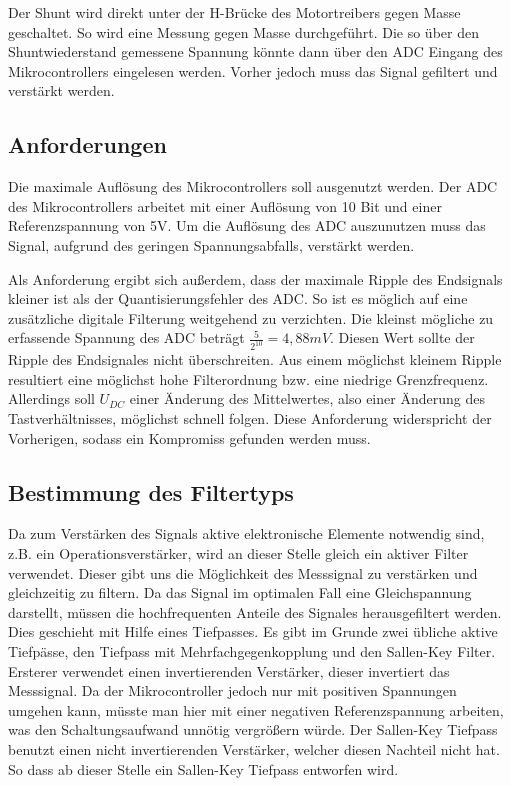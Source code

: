 Der Shunt wird direkt unter der H-Brücke des Motortreibers gegen Masse geschaltet. So wird eine Messung gegen Masse durchgeführt. Die so über den Shuntwiederstand gemessene Spannung könnte 
dann über den ADC Eingang des Mikrocontrollers eingelesen werden. Vorher jedoch muss das Signal gefiltert und verstärkt werden.

\subsection{Anforderungen}
Die maximale Auflösung des Mikrocontrollers soll ausgenutzt werden. Der ADC des Mikrocontrollers arbeitet mit einer Auflösung von 10 Bit und einer 
Referenzspannung von 5V. Um die Auflösung des ADC auszunutzen muss das Signal, aufgrund des geringen Spannungsabfalls, verstärkt werden.

Als Anforderung ergibt sich außerdem, dass der maximale Ripple des Endsignals kleiner ist als der Quantisierungsfehler des ADC.
So ist es möglich auf eine zusätzliche digitale Filterung weitgehend zu verzichten.
Die kleinst mögliche zu erfassende Spannung des ADC beträgt $\frac{5}{2^{10}}=4,88mV$.
Diesen Wert sollte der Ripple des Endsignales nicht überschreiten.
Aus einem möglichst kleinem Ripple resultiert eine möglichst hohe Filterordnung bzw. eine niedrige Grenzfrequenz.
Allerdings soll $U_{DC}$ einer Änderung des Mittelwertes, also einer Änderung des Tastverhältnisses, möglichst
schnell folgen. Diese Anforderung widerspricht der Vorherigen, sodass ein Kompromiss gefunden werden muss.

\subsection{Bestimmung des Filtertyps}
Da zum Verstärken des Signals aktive elektronische Elemente notwendig sind, z.B. ein Operationsverstärker, wird an dieser Stelle gleich ein aktiver Filter verwendet. 
Dieser gibt uns die Möglichkeit des Messsignal zu verstärken und gleichzeitig zu
filtern. Da das Signal im optimalen Fall eine Gleichspannung darstellt, müssen die hochfrequenten Anteile des Signales herausgefiltert werden. Dies geschieht 
mit Hilfe eines Tiefpasses. Es gibt im Grunde zwei übliche aktive Tiefpässe, den Tiefpass mit Mehrfachgegenkopplung und den Sallen-Key Filter. Ersterer verwendet
einen invertierenden Verstärker, dieser invertiert das Messsignal. Da der Mikrocontroller jedoch nur mit positiven Spannungen umgehen kann, müsste man hier mit einer 
negativen Referenzspannung arbeiten, was den Schaltungsaufwand unnötig vergrößern würde. Der Sallen-Key Tiefpass benutzt einen nicht invertierenden Verstärker, welcher diesen
Nachteil nicht hat. So dass ab dieser Stelle ein Sallen-Key Tiefpass entworfen wird.

